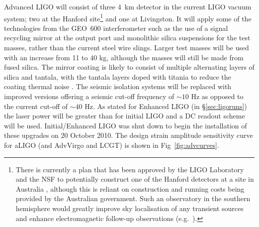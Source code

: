 \documentclass{article}
\begin{document}
Advanced LIGO will consist of three 4~km detector in the current LIGO vacuum
system; two at the Hanford site\footnote{There is currently a plan that
has been approved by the LIGO Laboratory and the NSF to potentially construct
one of the Hanford detectors at a site in Australia \cite{Marx:2010}, although
this is reliant on construction and running costs being provided by the
Australian government. Such an observatory in the southern hemisphere would
greatly improve sky localisation of any transient sources and enhance
electromagnetic follow-up observations (e.g.~\cite{Barriga:2010}).} and one at
Livingston. It will apply some of the technologies from the GEO~600
interferometer such as the use of a signal recycling mirror at the output port
and monolithic silica suspensions for the test masses, rather than the current
steel wire slings. Larger test masses will be used with an increase from 11 to
40 kg, although the masses will still be made from fused silica. The mirror
coating is likely to consist of multiple alternating layers of silica and
tantala, with the tantala layers doped with titania to reduce the coating
thermal noise \cite{Agresti:2006}. The seismic isolation systems will be
replaced with improved versions offering a seismic cut-off frequency of $\sim10$
Hz as opposed to the current cut-off of $\sim40$ Hz. As stated for Enhanced LIGO 
(in \S\ref{sec:ligoruns}) the laser power will be greater than for initial 
LIGO and a DC readout scheme will be used. Initial/Enhanced LIGO was shut down 
to begin the installation of these upgrades on 20 October 2010. The design
strain amplitude sensitivity curve for aLIGO (and AdvVirgo and LCGT) is shown
in Fig~\ref{fig:advcurves}.

\end{document}

